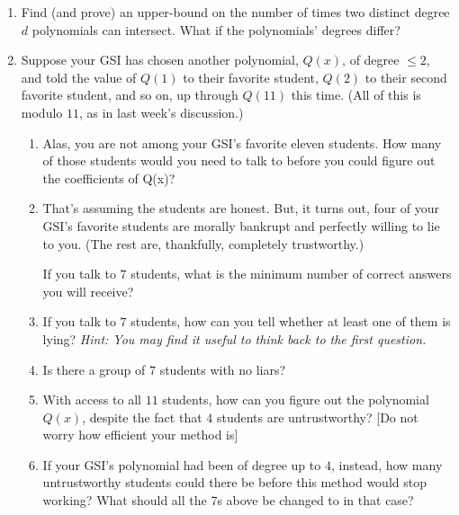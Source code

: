 \documentclass[11pt]{article}
\newif\ifsolutions
\begin{document}
\maketitle

\begin{enumerate}

% 
\item Find (and prove) an upper-bound on the number of times two distinct degree $d$ polynomials can intersect. What if the polynomials' degrees differ?

\ifsolutions
\textbf{Motivation for Problem:} 

\textbf{Solutions:} 
\fi


\item Suppose your GSI has chosen another polynomial, $Q(x)$, of degree $\leq 2$, 
and told the value of $Q(1)$ to their favorite student, $Q(2)$ to their second favorite student, and so on, 
up through $Q(11)$ this time. (All of this is modulo $11$, as in last week's discussion.)
\begin{enumerate}
\item Alas, you are not among your GSI's favorite eleven students. How many of those students would you need to talk to before 
you could figure out the coefficients of Q(x)?

\item That's assuming the students are honest. But, it turns out, four of your GSI's favorite students are morally 
bankrupt and perfectly willing to lie to you. (The rest are, thankfully, completely trustworthy.)

If you talk to $7$ students, what is the minimum number of correct answers you will receive?
\item If you talk to $7$ students, how can you tell whether at least one of them is lying? {\em Hint: You may find it useful to think back to the first question.}
\item Is there a group of $7$ students with no liars?
\item With access to all $11$ students, how can you figure out the polynomial $Q(x)$, 
despite the fact that $4$ students are untrustworthy? [Do not worry how efficient your method is]
\item If your GSI's polynomial had been of degree up to $4$, instead, how many untrustworthy students could there be before 
this method would stop working? What should all the 7s above be changed to in that case?
\end{enumerate}



\end{enumerate}
\end{document}
